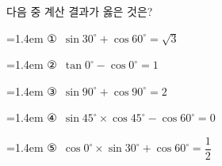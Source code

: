 다음 중 계산 결과가 옳은 것은?
\par\medskip\par\noindent\hangindent=1.4em {\small ①}\ $\sin 30^\circ+\cos 60^\circ=\sqrt{3}$\par\noindent\hangindent=1.4em {\small ②}\ $\tan 0^\circ-\cos 0^\circ=1$\par\noindent\hangindent=1.4em {\small ③}\ $\sin 90^\circ+\cos 90^\circ=2$\par\noindent\hangindent=1.4em {\small ④}\ $\sin 45^\circ\times\cos 45^\circ-\cos 60^\circ=0$\par\noindent\hangindent=1.4em {\small ⑤}\ $\cos 0^\circ\times\sin 30^\circ+\cos 60^\circ=\dfrac{1}{2}$\par\medskip
